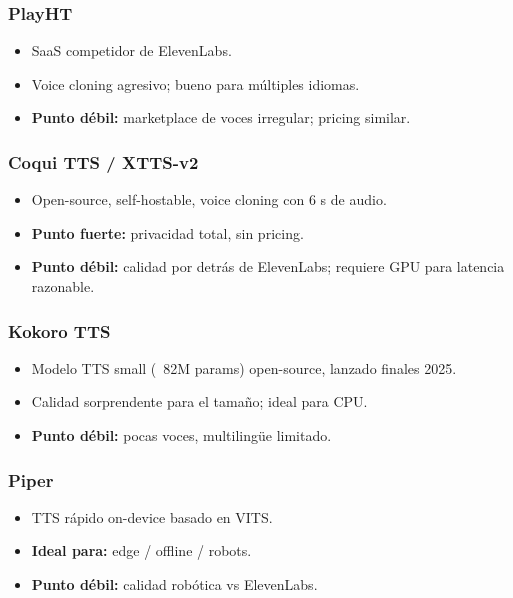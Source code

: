 \documentclass[11pt,a4paper]{article}
\begin{document}
\subsubsection{PlayHT}
\begin{itemize}[leftmargin=*,itemsep=0pt]
\item SaaS competidor de ElevenLabs.
\item Voice cloning agresivo; bueno para múltiples idiomas.
\item \textbf{Punto débil:} marketplace de voces irregular; pricing similar.
\end{itemize}

\subsubsection{Coqui TTS / XTTS-v2}
\begin{itemize}[leftmargin=*,itemsep=0pt]
\item Open-source, self-hostable, voice cloning con 6 s de audio.
\item \textbf{Punto fuerte:} privacidad total, sin pricing.
\item \textbf{Punto débil:} calidad por detrás de ElevenLabs; requiere GPU para latencia razonable.
\end{itemize}

\subsubsection{Kokoro TTS}
\begin{itemize}[leftmargin=*,itemsep=0pt]
\item Modelo TTS small (~82M params) open-source, lanzado finales 2025.
\item Calidad sorprendente para el tamaño; ideal para CPU.
\item \textbf{Punto débil:} pocas voces, multilingüe limitado.
\end{itemize}

\subsubsection{Piper}
\begin{itemize}[leftmargin=*,itemsep=0pt]
\item TTS rápido on-device basado en VITS.
\item \textbf{Ideal para:} edge / offline / robots.
\item \textbf{Punto débil:} calidad robótica vs ElevenLabs.
\end{itemize}
\end{document}
